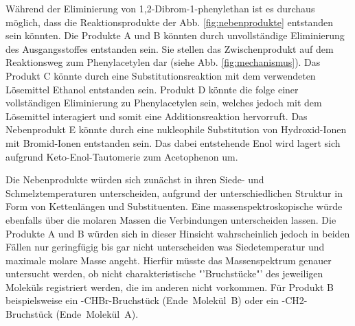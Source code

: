 Während der Eliminierung von 1,2-Dibrom-1-phenylethan ist es durchaus möglich, dass die Reaktionsprodukte der Abb. \ref{fig:nebenprodukte} entstanden sein könnten. 
Die Produkte A und B könnten durch unvollständige Eliminierung des Ausgangsstoffes entstanden sein. Sie stellen das Zwischenprodukt auf dem Reaktionsweg zum Phenylacetylen dar (siehe Abb. \ref{fig:mechanismus}). Das Produkt C könnte durch eine Substitutionsreaktion mit dem verwendeten Lösemittel Ethanol entstanden sein. Produkt D könnte die folge einer vollständigen Eliminierung zu Phenylacetylen sein, welches jedoch mit dem Lösemittel interagiert und somit eine Additionsreaktion hervorruft. Das Nebenprodukt E könnte durch eine nukleophile Substitution von Hydroxid-Ionen mit Bromid-Ionen entstanden sein. Das dabei entstehende Enol wird lagert sich aufgrund Keto-Enol-Tautomerie zum Acetophenon um.


Die Nebenprodukte würden sich zunächst in ihren Siede- und Schmelztemperaturen unterscheiden, aufgrund der unterschiedlichen Struktur in Form von Kettenlängen und Substituenten. Eine massenspektroskopische würde ebenfalls über die molaren Massen die Verbindungen unterscheiden lassen. Die Produkte A und B würden sich in dieser Hinsicht wahrscheinlich jedoch in beiden Fällen nur geringfügig bis gar nicht unterscheiden was Siedetemperatur und maximale molare Masse angeht. Hierfür müsste das Massenspektrum genauer untersucht werden, ob nicht charakteristische "'Bruchstücke"' des jeweiligen Moleküls registriert werden, die im anderen nicht vorkommen. Für Produkt B beispielsweise ein -CHBr-Bruchstück \mbox{(Ende Molekül B)} oder ein -CH2-Bruchstück \mbox{(Ende Molekül A)}.
